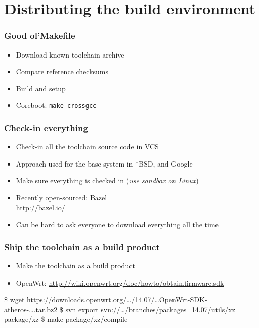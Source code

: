 \documentclass[14pt,aspectratio=169]{beamer}
\begin{document}
\section{Distributing the build environment}

\begin{frame}
 \frametitle{Good ol'Makefile}

 \begin{itemize}
  \item Download known toolchain archive
  \item Compare reference checksums
  \item Build and setup
  \item Coreboot: \texttt{make crossgcc}
 \end{itemize}
\end{frame}

\begin{frame}
 \frametitle{Check-in everything}

 \begin{itemize}
  \item Check-in all the toolchain source code in VCS
  \item Approach used for the base system in *BSD, and Google
  \item Make sure everything is checked in (\textit{use sandbox on Linux})
  \item Recently open-sourced: Bazel \\
   \url{http://bazel.io/}
  \item Can be hard to ask everyone to download everything all the time
 \end{itemize}
\end{frame}

\begin{frame}[fragile]
 \frametitle{Ship the toolchain as a build product}

 \begin{itemize}
  \item Make the toolchain as a build product
  \item OpenWrt:
    \url{http://wiki.openwrt.org/doc/howto/obtain.firmware.sdk}
 \end{itemize}

 \begin{example}\footnotesize
\begin{semiverbatim}
\$ wget https://downloads.openwrt.org/…/14.07/…OpenWrt-SDK-atheros-….tar.bz2
\$ svn export svn://…/branches/packages\_14.07/utils/xz package/xz
\$ make package/xz/compile
\end{semiverbatim}
 \end{example}

\end{frame}
\end{document}
